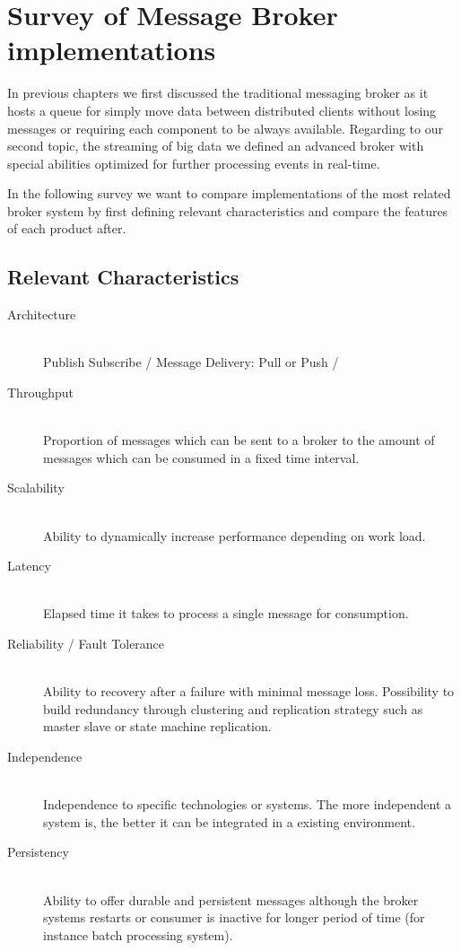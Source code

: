 \chapter{Survey of Message Broker implementations} 
\label{survey-broker}
In previous chapters we first discussed the traditional messaging broker as it hosts a queue
for simply move data between distributed clients without losing messages or
requiring each component to be always available. Regarding to our second topic,
the streaming of big data we defined an advanced broker with special abilities
optimized for further processing events in real-time. 

In the following survey we want to compare implementations of the most related
broker system by first defining relevant characteristics and compare the
features of each product after.

\section{Relevant Characteristics}
\begin{description}
    \item [Architecture] \hfill \\
    {Publish Subscribe / Message Delivery:  Pull or Push / }
    \item [Throughput] \hfill \\
        {Proportion of messages which can be sent to a broker to the amount of
        messages which can be consumed in a fixed time interval.}
    \item [Scalability] \hfill \\
    {Ability to dynamically increase performance depending on work load.  }
    \item [Latency]\hfill \\
    {Elapsed time it takes to process a single message for consumption.  }
    \item [Reliability / Fault Tolerance] \hfill \\
        {Ability to recovery after a failure with minimal message loss.
        Possibility to build redundancy through clustering and replication strategy such as
    master slave or state machine replication. }
    \item [Independence] \hfill \\
    { Independence to specific technologies or systems. The more independent
    a system is, the better it can be integrated in a existing environment. }
    \item [Persistency] \hfill \\ 
        {Ability to offer durable and persistent messages although the broker
            systems restarts or consumer is inactive for longer period of time
            (for instance batch processing system). }

\end{description}
